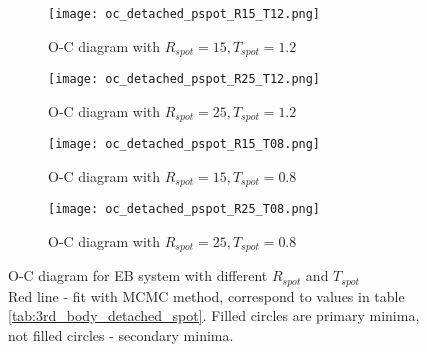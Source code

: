 \begin{figure}[!h]
    \centering
    \begin{subfigure}[t]{0.5\textwidth}
        \centering
        \texttt{[image: oc\_detached\_pspot\_R15\_T12.png]}
        \caption{O-C diagram with $R_{spot}=15, T_{spot}=1.2$}
    \end{subfigure}%
    \begin{subfigure}[t]{0.5\textwidth}
        \centering
        \texttt{[image: oc\_detached\_pspot\_R25\_T12.png]}
        \caption{O-C diagram with $R_{spot}=25, T_{spot}=1.2$}
    \end{subfigure}
    
    \begin{subfigure}[t]{0.5\textwidth}
        \centering
        \texttt{[image: oc\_detached\_pspot\_R15\_T08.png]}
        \caption{O-C diagram with $R_{spot}=15, T_{spot}=0.8$}
    \end{subfigure}%
    \begin{subfigure}[t]{0.5\textwidth}
        \centering
        \texttt{[image: oc\_detached\_pspot\_R25\_T08.png]}
        \caption{O-C diagram with $R_{spot}=25, T_{spot}=0.8$}
    \end{subfigure}
    \caption{O-C diagram for EB system with different $R_{spot}$ and $T_{spot}$\\
    Red line - fit with MCMC method, correspond to values in table \ref{tab:3rd_body_detached_spot}. 
    Filled circles are primary minima, not filled circles - secondary minima.}
\label{fig:oc_detached_spot}
\end{figure}


